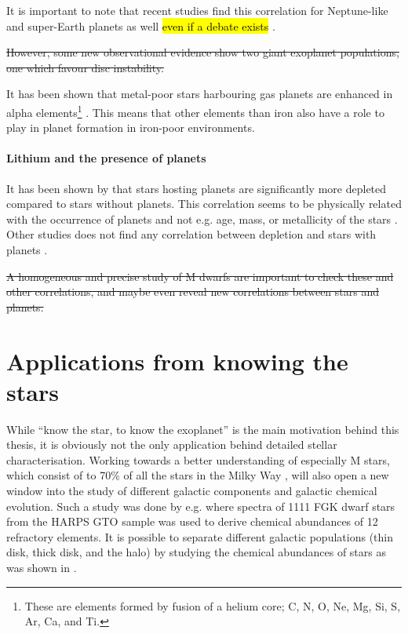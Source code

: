 It is important to note that recent studies find this correlation for Neptune-like and super-Earth
planets as well \citep{Adibekyan2012a,Wang2015,Zhu2016} \hl{even if a debate exists}
\citep{Sousa2011,Buchhave2012}.

\st{However, some new observational evidence show two giant exoplanet populations, one which favour
disc instability.}

It has been shown that metal-poor stars harbouring gas planets are enhanced in alpha
elements\footnote{These are elements formed by fusion of a helium core; C, N, O, Ne, Mg, Si, S, Ar,
Ca, and Ti.} \citep[see e.g.][]{Adibekyan2012a}. This means that other elements than iron also have
a role to play in planet formation in iron-poor environments.


\paragraph{Lithium and the presence of planets}

It has been shown by \citet{Israelian2004,Delgado2014,Figueira2014a,Gonzalez2015,Takeda2005} that
stars hosting planets are significantly more  depleted compared to stars without planets.
This correlation seems to be physically related with the occurrence of planets and not e.g. age,
mass, or metallicity of the stars \citep{Sousa2010}. Other studies does not find any correlation
between  depletion and stars with planets \citep{Baumann2010,Ramirez2012}.

\st{A homogeneous and precise study of M dwarfs are important to check these and other correlations,
and maybe even reveal new correlations between stars and planets.}



\section{Applications from knowing the stars}
\label{sec:stars_application}

While ``know the star, to know the exoplanet'' is the main motivation behind this thesis, it is
obviously not the only application behind detailed stellar characterisation. Working towards a
better understanding of especially M stars, which consist of to 70\% of all the stars in the Milky
Way \citep{Bochanski2010}, will also open a new window into the study of different galactic
components and galactic chemical evolution. Such a study was done by e.g.
\citet{Adibekyan2012,Delgado2017} where spectra of 1111 FGK dwarf stars from the HARPS GTO sample
was used to derive chemical abundances of 12 refractory elements. It is possible to separate
different galactic populations (thin disk, thick disk, and the halo) by studying the chemical
abundances of stars as was shown in \citet{Adibekyan2012}.


